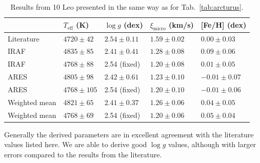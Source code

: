 \documentclass{aa}
\begin{document}
\begin{table}[htb!]
    \caption{Results from 10 Leo presented in the same way as for
             Tab.~\ref{tab:arcturus}.}
    \label{tab:10Leo}
    \centering
    \begin{tabular}{lllll}
      \hline\hline
                      & $T_\mathrm{eff}$ (K) &  $\log g$ (dex)  &   $\xi_\mathrm{micro}$ (km/s)   & [Fe/H] (dex)     \\
      \hline
        Literature    & $4720 \pm  42$       &  $2.54 \pm 0.11$ &    $1.59 \pm 0.02$              & $ 0.00 \pm 0.03$ \\
      \hline
        IRAF          & $4835 \pm  85$       &  $2.41 \pm 0.41$ &    $1.28 \pm 0.08$              & $ 0.09 \pm 0.06$ \\
        IRAF          & $4768 \pm  88$       &   2.54 (fixed)   &    $1.20 \pm 0.08$              & $ 0.01 \pm 0.05$ \\
      \hline
        ARES          & $4805 \pm  98$       &  $2.42 \pm 0.61$ &    $1.23 \pm 0.10$              & $-0.01 \pm 0.07$ \\
        ARES          & $4768 \pm 105$       &   2.54 (fixed)   &    $1.20 \pm 0.10$              & $-0.01 \pm 0.06$ \\
      \hline
        Weighted mean & $4821 \pm  65$       &  $2.41 \pm 0.37$ &    $1.26 \pm 0.06$              & $ 0.04 \pm 0.05$ \\
        Weighted mean & $4768 \pm  69$       &   2.54 (fixed)   &    $1.20 \pm 0.06$              & $ 0.05 \pm 0.04$ \\
      \hline
    \end{tabular}
\end{table}

Generally the derived parameters are in excellent agreement with the literature
values listed here. We are able to derive good $\log g$ values, although with
larger errors compared to the results from the literature.
\end{document}
